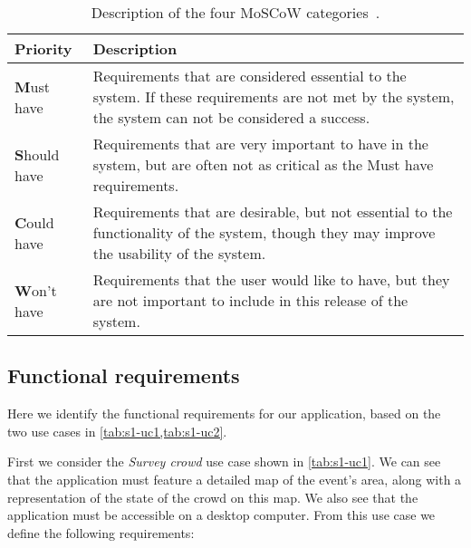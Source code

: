 \begin{table}[h!]
	\centering
	\begin{tabularx}{\textwidth}{lX}
		\toprule
		\textbf{Priority} & \textbf{Description} \\
		\midrule
		\rowcolor[HTML]{EFEFEF} 
		\textbf{M}ust have & Requirements that are considered essential to the system. If these requirements are not met by the system, the system can not be considered a success. \\
		\textbf{S}hould have & Requirements that are very important to have in the system, but are often not as critical as the Must have requirements. \\
		\rowcolor[HTML]{EFEFEF} 
		\textbf{C}ould have & Requirements that are desirable, but not essential to the functionality of the system, though they may improve the usability of the system. \\
		\textbf{W}on't have & Requirements that the user would like to have, but they are not important to include in this release of the system. \\
		\bottomrule
	\end{tabularx}
	\caption{Description of the four MoSCoW categories~\cite{moscow}.}
	\label{tab:moscow}
\end{table}

\subsection{Functional requirements}
Here we identify the functional requirements for our application, based on the two use cases in \cref{tab:s1-uc1,tab:s1-uc2}. 

First we consider the \emph{Survey crowd} use case shown in \cref{tab:s1-uc1}. We can see that the application must feature a detailed map of the event's area, along with a representation of the state of the crowd on this map. We also see that the application must be accessible on a desktop computer. From this use case we define the following requirements:

